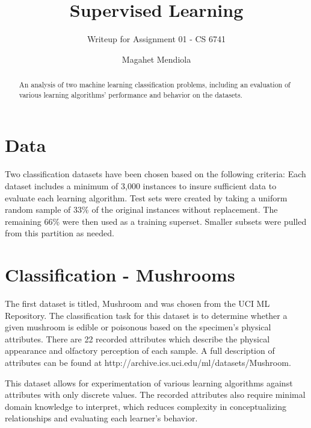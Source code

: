 \documentclass{sig-alternate}
\begin{document}
\title{Supervised Learning}
\subtitle{Writeup for Assignment 01 - CS 6741}

\author{
\alignauthor
Magahet Mendiola
}
\date{}

\maketitle
\begin{abstract}
An analysis of two machine learning classification problems, including an evaluation of various learning algorithms' performance and behavior on the datasets.
\end{abstract}
 


\section{Data}

Two classification datasets have been chosen based on the following criteria: Each dataset includes a minimum of 3,000 instances to insure sufficient data to evaluate each learning algorithm. Test sets were created by taking a uniform random sample of 33\% of the original instances without replacement. The remaining 66\% were then used as a training superset. Smaller subsets were pulled from this partition as needed.


\section{Classification - Mushrooms}

The first dataset is titled, Mushroom \cite{Bache+Lichman:2013} and was chosen from the UCI ML Repository. The classification task for this dataset is to determine whether a given mushroom is edible or poisonous based on the specimen's physical attributes. There are 22 recorded attributes which describe the physical appearance and olfactory perception of each sample. A full description of attributes can be found at http://archive.ics.uci.edu/ml/datasets/Mushroom.

This dataset allows for experimentation of various learning algorithms against attributes with only discrete values. The recorded attributes also require minimal domain knowledge to interpret, which reduces complexity in conceptualizing relationships and evaluating each learner's behavior.
\end{document}
